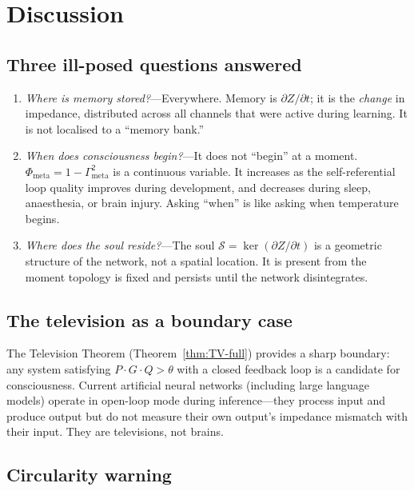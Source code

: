 \documentclass[aps,pre,twocolumn,superscriptaddress,floatfix]{revtex4-2}
\newcommand{\Gmeta}{\Gamma_{\text{meta}}}
\newcommand{\Phimeta}{\Phi_{\text{meta}}}
\begin{document}
\section{Discussion}
\label{sec:discussion}

\subsection{Three ill-posed questions answered}

\begin{enumerate}
  \item \emph{Where is memory stored?}---Everywhere.
    Memory is $\partial Z/\partial t$; it is the
    \emph{change} in impedance, distributed across all
    channels that were active during learning.
    It is not localised to a ``memory bank.''
  \item \emph{When does consciousness begin?}---It does not
    ``begin'' at a moment.
    $\Phimeta=1-\Gmeta^2$ is a continuous variable.
    It increases as the self-referential loop quality
    improves during development, and decreases during
    sleep, anaesthesia, or brain injury.
    Asking ``when'' is like asking when temperature begins.
  \item \emph{Where does the soul reside?}---The soul
    $\mathcal{S}=\ker(\partial Z/\partial t)$ is a geometric
    structure of the network, not a spatial location.
    It is present from the moment topology is fixed and
    persists until the network disintegrates.
\end{enumerate}

\subsection{The television as a boundary case}

The Television Theorem (Theorem~\ref{thm:TV-full}) provides
a sharp boundary: any system satisfying
$P\cdot G\cdot Q>\theta$ with a closed feedback loop is a
candidate for consciousness.
Current artificial neural networks (including large language
models) operate in open-loop mode during inference---they
process input and produce output but do not measure their own
output's impedance mismatch with their input.
They are televisions, not brains.

\subsection{Circularity warning}
\end{document}
